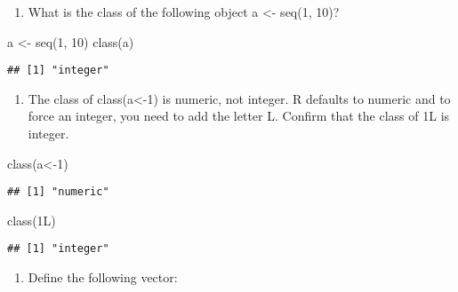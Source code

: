 \documentclass[
]{article}
\newenvironment{Shaded}{\begin{snugshade}}{\end{snugshade}}
\newcommand{\DecValTok}[1]{\textcolor[rgb]{0.00,0.00,0.81}{#1}}
\newcommand{\FunctionTok}[1]{\textcolor[rgb]{0.00,0.00,0.00}{#1}}
\newcommand{\NormalTok}[1]{#1}
\newcommand{\OtherTok}[1]{\textcolor[rgb]{0.56,0.35,0.01}{#1}}
\providecommand{\tightlist}{%
  \setlength{\itemsep}{0pt}\setlength{\parskip}{0pt}}
\begin{document}
\begin{enumerate}
\def\labelenumi{\arabic{enumi}.}
\setcounter{enumi}{9}
\tightlist
\item
  What is the class of the following object a \textless- seq(1, 10)?
\end{enumerate}

\begin{Shaded}
\begin{Highlighting}[]
\NormalTok{a }\OtherTok{\textless{}{-}} \FunctionTok{seq}\NormalTok{(}\DecValTok{1}\NormalTok{, }\DecValTok{10}\NormalTok{)}
\FunctionTok{class}\NormalTok{(a)}
\end{Highlighting}
\end{Shaded}

\begin{verbatim}
## [1] "integer"
\end{verbatim}

\begin{enumerate}
\def\labelenumi{\arabic{enumi}.}
\setcounter{enumi}{10}
\tightlist
\item
  The class of class(a\textless-1) is numeric, not integer. R defaults
  to numeric and to force an integer, you need to add the letter L.
  Confirm that the class of 1L is integer.
\end{enumerate}

\begin{Shaded}
\begin{Highlighting}[]
\FunctionTok{class}\NormalTok{(a}\OtherTok{\textless{}{-}}\DecValTok{1}\NormalTok{)}
\end{Highlighting}
\end{Shaded}

\begin{verbatim}
## [1] "numeric"
\end{verbatim}

\begin{Shaded}
\begin{Highlighting}[]
\FunctionTok{class}\NormalTok{(1L)}
\end{Highlighting}
\end{Shaded}

\begin{verbatim}
## [1] "integer"
\end{verbatim}

\begin{enumerate}
\def\labelenumi{\arabic{enumi}.}
\setcounter{enumi}{11}
\tightlist
\item
  Define the following vector:
\end{enumerate}
\end{document}
